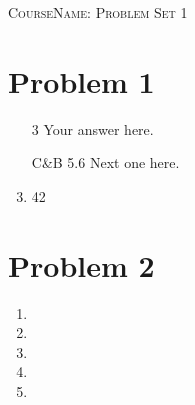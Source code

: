 \documentclass{article}
\newcommand{\coursename}{CourseName}
\newcommand{\exerciseset}{Problem Set 1}
\theoremstyle{plain}
\begin{document}
\begin{center}
\huge
\textsc{\coursename : \exerciseset}
\end{center}

\section*{Problem 1}
\begin{enumerate}
\item[3] %
Your answer here.
\item[C\&B 5.6] %
Next one here.
\item %
42
\end{enumerate}

\section*{Problem 2}
\begin{enumerate}
\item %
\item %
\item %
\item %
\item %
\end{enumerate}


\renewcommand{\mkbibnamefamily}[1]{\textsc{#1}} %
\printbibliography
\end{document}
